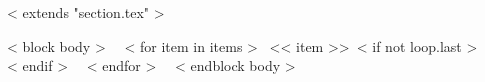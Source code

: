 ~< extends "section.tex" >~

~< block body >~
~< for item in items >~
<< item >>~< if not loop.last >~ \\
~< endif >~
~< endfor >~
~< endblock body >~
